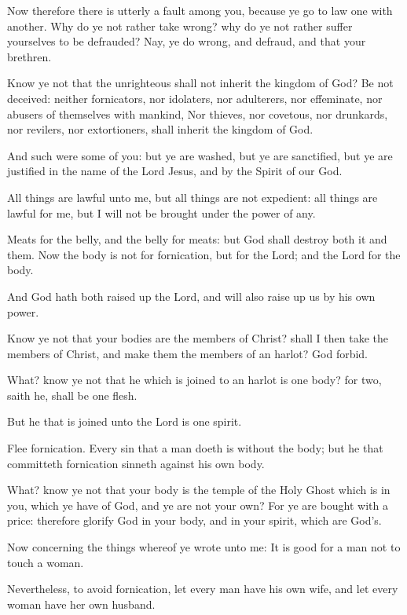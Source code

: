 \Verse Now therefore there is utterly a fault among you, because ye go to law one with another. Why do ye not rather take wrong? why do ye not rather suffer yourselves to be defrauded?  \Verse Nay, ye do wrong, and defraud, and that your brethren.

\Verse Know ye not that the unrighteous shall not inherit the kingdom of God?  Be not deceived: neither fornicators, nor idolaters, nor adulterers, nor effeminate, nor abusers of themselves with mankind, \Verse Nor thieves, nor covetous, nor drunkards, nor revilers, nor extortioners, shall inherit the kingdom of God.

\Verse And such were some of you: but ye are washed, but ye are sanctified, but ye are justified in the name of the Lord Jesus, and by the Spirit of our God.

\Verse All things are lawful unto me, but all things are not expedient: all things are lawful for me, but I will not be brought under the power of any.

\Verse Meats for the belly, and the belly for meats: but God shall destroy both it and them. Now the body is not for fornication, but for the Lord; and the Lord for the body.

\Verse And God hath both raised up the Lord, and will also raise up us by his own power.

\Verse Know ye not that your bodies are the members of Christ? shall I then take the members of Christ, and make them the members of an harlot? God forbid.

\Verse What? know ye not that he which is joined to an harlot is one body?  for two, saith he, shall be one flesh.

\Verse But he that is joined unto the Lord is one spirit.

\Verse Flee fornication. Every sin that a man doeth is without the body; but he that committeth fornication sinneth against his own body.

\Verse What? know ye not that your body is the temple of the Holy Ghost which is in you, which ye have of God, and ye are not your own?  \Verse For ye are bought with a price: therefore glorify God in your body, and in your spirit, which are God's.


\Chapter
\Verse Now concerning the things whereof ye wrote unto me: It is good for a man not to touch a woman.

\Verse Nevertheless, to avoid fornication, let every man have his own wife, and let every woman have her own husband.

